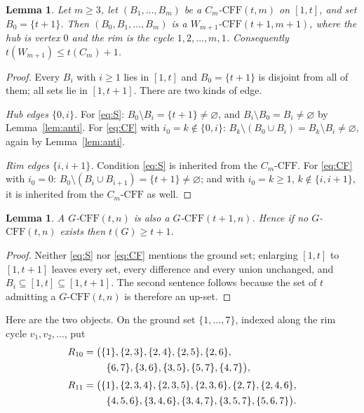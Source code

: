 \documentclass[11pt]{amsart}
\newtheorem{lemma}[theorem]{Lemma}
\newcommand{\CFF}{\mathrm{CFF}}
\begin{document}
\begin{lemma}\label{lem:hub}
Let $m\ge3$, let $(B_1,\dots,B_m)$ be a $C_m$-$\CFF(t,m)$ on $[1,t]$, and set
$B_0=\{t+1\}$. Then $(B_0,B_1,\dots,B_m)$ is a $W_{m+1}$-$\CFF(t+1,m+1)$, where
the hub is vertex $0$ and the rim is the cycle $1,2,\dots,m,1$. Consequently
$t(W_{m+1})\le t(C_m)+1$.
\end{lemma}

\begin{proof}
Every $B_i$ with $i\ge1$ lies in $[1,t]$ and $B_0=\{t+1\}$ is disjoint from all
of them; all sets lie in $[1,t+1]$. There are two kinds of edge.

\emph{Hub edges $\{0,i\}$.} For \eqref{eq:S}:
$B_0\setminus B_i=\{t+1\}\neq\varnothing$, and
$B_i\setminus B_0=B_i\neq\varnothing$ by Lemma~\ref{lem:anti}. For
\eqref{eq:CF} with $i_0=k\notin\{0,i\}$:
$B_k\setminus(B_0\cup B_i)=B_k\setminus B_i\neq\varnothing$, again by
Lemma~\ref{lem:anti}.

\emph{Rim edges $\{i,i+1\}$.} Condition \eqref{eq:S} is inherited from the
$C_m$-$\CFF$. For \eqref{eq:CF} with $i_0=0$:
$B_0\setminus(B_i\cup B_{i+1})=\{t+1\}\neq\varnothing$; and with $i_0=k\ge1$,
$k\notin\{i,i+1\}$, it is inherited from the $C_m$-$\CFF$ as well.
\end{proof}

\begin{lemma}\label{lem:mono}
A $G$-$\CFF(t,n)$ is also a $G$-$\CFF(t+1,n)$. Hence if no $G$-$\CFF(t,n)$
exists then $t(G)\ge t+1$.
\end{lemma}

\begin{proof}
Neither \eqref{eq:S} nor \eqref{eq:CF} mentions the ground set; enlarging
$[1,t]$ to $[1,t+1]$ leaves every set, every difference and every union
unchanged, and $B_i\subseteq[1,t]\subseteq[1,t+1]$. The second sentence follows
because the set of $t$ admitting a $G$-$\CFF(t,n)$ is therefore an up-set.
\end{proof}

Here are the two objects. On the ground set $\{1,\dots,7\}$, indexed along the
rim cycle $v_1,v_2,\dots$, put
\begin{align}
 R_{10}&=\bigl(\{1\},\{2,3\},\{2,4\},\{2,5\},\{2,6\},
   \notag\\
       &\qquad\ \{6,7\},\{3,6\},\{3,5\},\{5,7\},\{4,7\}\bigr),
   \label{eq:R10}\\[2pt]
 R_{11}&=\bigl(\{1\},\{2,3,4\},\{2,3,5\},\{2,3,6\},\{2,7\},\{2,4,6\},
   \notag\\
       &\qquad\ \{4,5,6\},\{3,4,6\},\{3,4,7\},\{3,5,7\},\{5,6,7\}\bigr).
   \label{eq:R11}
\end{align}
\end{document}
